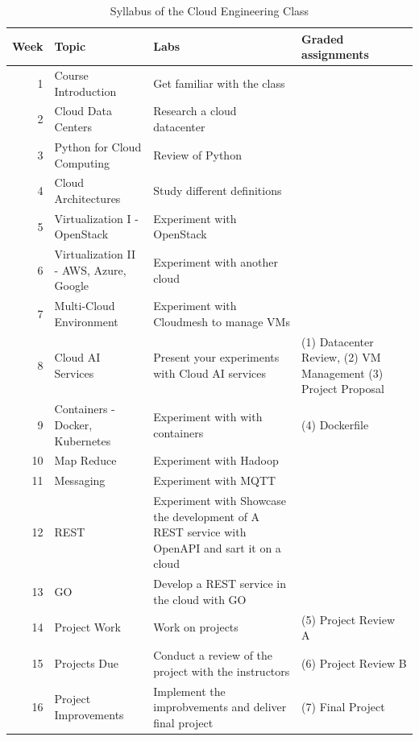 \documentclass[conference]{IEEEtran}
\begin{document}
\begin{table}[thb]
  \caption{Syllabus of the Cloud Engineering Class}\label{tab:syllabus}
\begin{center}
  \begin{tabular}{|r|l|p{6cm}|p{3cm}|}
    \hline
    Week & Topic & Labs & Graded assignments \\
    \hline
 1    & Course Introduction & Get familiar with the class & \\
    2    & Cloud Data Centers & Research a cloud datacenter & 
    \\
    3    & Python for Cloud Computing &
                                        Review of Python &
                                                    \\
 4    & Cloud Architectures & Study different definitions & \\
 5    & Virtualization I - OpenStack & Experiment with OpenStack & \\
 6    & Virtualization II - AWS, Azure, Google & Experiment with another
                                                   cloud & \\
 7    & Multi-Cloud Environment &Experiment with Cloudmesh to manage VMs & \\
 8    & Cloud AI Services & Present your experiments with Cloud AI
                            services & (1) Datacenter Review, \newline
                                       (2) VM
                                       Management \newline (3) Project
                                       Proposal \\
 9    & Containers - Docker, Kubernetes & Experiment with with
                                          containers & (4) Dockerfile \\
 10   & Map Reduce & Experiment with Hadoop & \\
 11   & Messaging & Experiment with MQTT & \\
 12   & REST & Experiment with Showcase the development of A REST service with OpenAPI
    and sart it on a cloud & \\
 13   & GO  & Develop a REST service in the cloud with GO & \\
 14   & Project Work & Work on projects & (5) Project Review A\\
 15   & Projects Due & Conduct a review of the project with the
                       instructors & (6) Project Review B \\
    16   & Project Improvements & Implement the improbvements and
                                  deliver final project & (7) Final Project
                                                     \\
    \hline
  \end{tabular}
  \end{center}
  \end{table}
\end{document}
